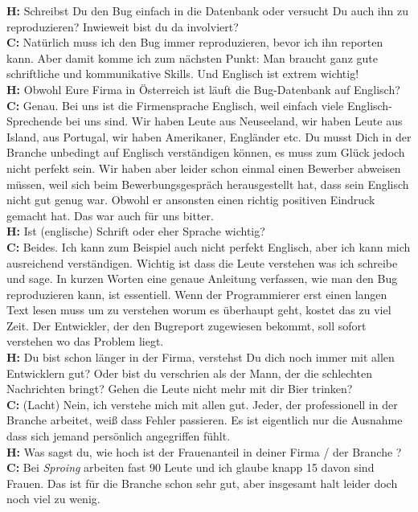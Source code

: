 \textbf{H:} Schreibst Du den Bug einfach in die Datenbank oder versucht Du auch ihn zu reproduzieren? Inwieweit bist du da involviert? \\
\textbf{C:} Natürlich muss ich den Bug immer reproduzieren, bevor ich ihn reporten kann. Aber damit komme ich zum nächsten Punkt: Man braucht ganz gute schriftliche und kommunikative Skills. Und Englisch ist extrem wichtig! \\
\textbf{H:} Obwohl Eure Firma in Österreich ist läuft die Bug-Datenbank auf Englisch?  \\
\textbf{C:} Genau. Bei uns ist die Firmensprache Englisch, weil einfach viele Englisch-Sprechende bei uns sind. Wir haben Leute aus Neuseeland, wir haben Leute aus Island, aus Portugal, wir haben Amerikaner, Engländer etc. Du musst Dich in der Branche unbedingt auf Englisch verständigen können, es muss zum Glück jedoch nicht perfekt sein. Wir haben aber leider schon einmal einen Bewerber abweisen müssen, weil sich beim Bewerbungsgespräch herausgestellt hat, dass sein Englisch nicht gut genug war. Obwohl er ansonsten einen richtig positiven Eindruck gemacht hat. Das war auch für uns bitter. \\
\textbf{H:} Ist (englische) Schrift oder eher Sprache wichtig? \\
\textbf{C:} Beides. Ich kann zum Beispiel auch nicht perfekt Englisch, aber ich kann mich ausreichend verständigen. Wichtig ist dass die Leute verstehen was ich schreibe und sage. In kurzen Worten eine genaue Anleitung verfassen, wie man den Bug reproduzieren kann, ist essentiell. Wenn der Programmierer erst einen langen Text lesen muss um zu verstehen worum es überhaupt geht, kostet das zu viel Zeit. Der Entwickler, der den Bugreport zugewiesen bekommt, soll sofort verstehen wo das Problem liegt. \\
\textbf{H:} Du bist schon länger in der Firma, verstehst Du dich noch immer mit allen Entwicklern gut? Oder bist du verschrien als der Mann, der die schlechten Nachrichten bringt? Gehen die Leute nicht mehr mit dir Bier trinken? \\
\textbf{C:} (Lacht) Nein, ich verstehe mich mit allen gut. Jeder, der professionell in der Branche arbeitet, weiß dass Fehler passieren. Es ist eigentlich nur die Ausnahme dass sich jemand persönlich angegriffen fühlt. \\
\textbf{H:} Was sagst du, wie hoch ist der Frauenanteil in deiner Firma / der Branche ? \\
\textbf{C:} Bei \textit{Sproing} arbeiten fast 90 Leute und ich glaube knapp 15 davon sind Frauen. Das ist für die Branche schon sehr gut, aber insgesamt halt leider doch noch viel zu wenig. \\
